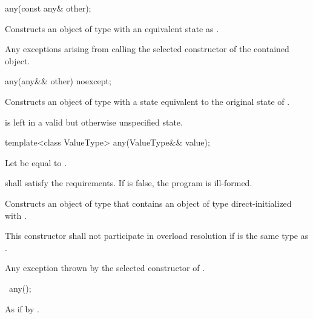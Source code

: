 \begin{itemdecl}
any(const any& other);
\end{itemdecl}

\begin{itemdescr}
\pnum
\effects
Constructs an object of type  with an equivalent state as .

\pnum
\throws
Any exceptions arising from calling the selected constructor of the contained object.
\end{itemdescr}

\begin{itemdecl}
any(any&& other) noexcept;
\end{itemdecl}

\begin{itemdescr}
\pnum
\effects
Constructs an object of type  with a state equivalent to the original state of .

\pnum
\postcondition
{} is left in a valid but otherwise unspecified state.
\end{itemdescr}

\begin{itemdecl}
template<class ValueType>
any(ValueType&& value);
\end{itemdecl}

\begin{itemdescr}
\pnum
Let  be equal to .

\pnum
\requires
{} shall satisfy the  requirements.
If  is false, the program is ill-formed.

\pnum
\effects
Constructs an object of type  that contains an object of type  direct-initialized with .

\pnum
\remarks
This constructor shall not participate in overload resolution if  is the same type as .

\pnum
\throws
Any exception thrown by the selected constructor of .
\end{itemdescr}

\begin{itemdecl}
~any();
\end{itemdecl}

\begin{itemdescr}
\pnum
\effects
As if by .
\end{itemdescr}

